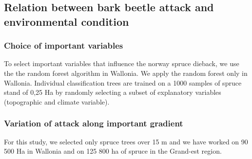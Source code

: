 \documentclass[3p,procedia]{elsarticle}
\begin{document}



\subsection{Relation between bark beetle attack and environmental condition}

\subsubsection{Choice of important variables}

To select important variables that influence the norway spruce dieback, we use the the random forest algorithm \citep{genuer_vsurf_2015} in Wallonia.
We apply the random forest only in Wallonia.
Individual classification trees are trained on a 1000 samples of spruce stand of 0,25 Ha by randomly selecting a subset of explanatory variables (topographic and  climate variable).






\subsubsection{Variation of attack along important gradient}
For this study, we selected only spruce trees over 15 m and we have worked on 90 500 Ha in Wallonia and  on 125 800 ha of spruce in the Grand-est region.  
			


\end{document}
